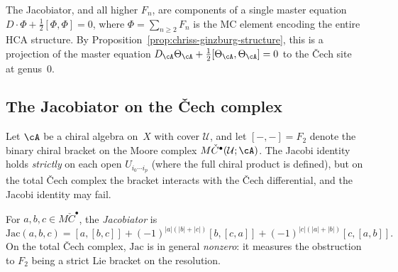 The Jacobiator, and all higher
$F_n$, are components of a single master equation
$D \cdot \Phi + \tfrac{1}{2}[\Phi,\Phi] = 0$, where
$\Phi = \sum_{n \geq 2} F_n$ is the MC element encoding the
entire HCA structure. By Proposition~\ref{prop:chriss-ginzburg-structure}, this is a
projection of the master equation
$D_{\cA}\Theta_{\cA} + \tfrac{1}{2}[\Theta_{\cA},\Theta_{\cA}] = 0$
to the \v{C}ech site at genus~$0$.

\subsection{The Jacobiator on the \v{C}ech complex}
\label{subsec:jacobiator-cech}

Let $\cA$ be a chiral algebra on~$X$ with cover $\mathcal{U}$,
and let $[{-},{-}] = F_2$ denote the binary chiral bracket on the
Moore complex $M\check{C}^\bullet(\mathcal{U};\cA)$. The Jacobi
identity holds \emph{strictly} on each open $U_{i_0\cdots i_p}$
(where the full chiral product is defined), but on the total
\v{C}ech complex the bracket interacts with the \v{C}ech
differential, and the Jacobi identity may fail.

\begin{definition}[Jacobiator]
\label{def:jacobiator}
For $a,b,c \in M\check{C}^\bullet$, the \emph{Jacobiator} is
\[
\mathrm{Jac}(a,b,c)
= [a,[b,c]] + (-1)^{|a|(|b|+|c|)}[b,[c,a]]
 + (-1)^{|c|(|a|+|b|)}[c,[a,b]].
\]
On the total \v{C}ech complex, $\mathrm{Jac}$ is in general
\emph{nonzero}: it measures the obstruction to $F_2$ being a
strict Lie bracket on the resolution.
\end{definition}

